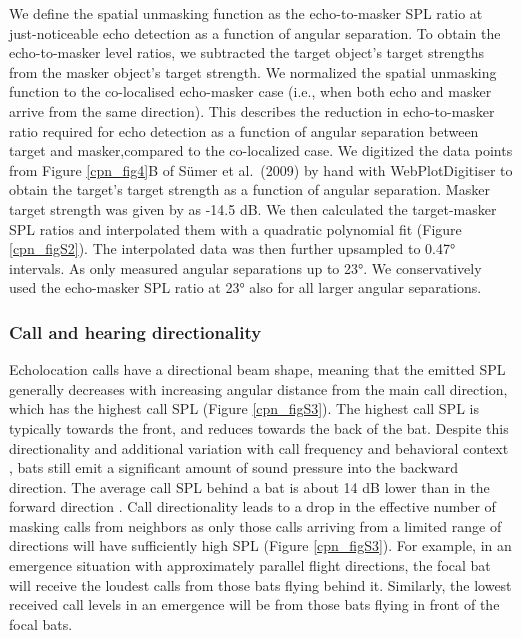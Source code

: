 \documentclass[
]{book}
\begin{document}
We define the spatial unmasking function as the echo-to-masker SPL ratio at just-noticeable echo detection as a function of angular separation. To obtain the echo-to-masker level ratios, we subtracted the target object's target strengths from the masker object's target strength. We normalized the spatial unmasking function to the co-localised echo-masker case (i.e., when both echo and masker arrive from the same direction). This describes the reduction in echo-to-masker ratio required for echo detection as a function of angular separation between target and masker,compared to the co-localized case. We digitized the data points from Figure \ref{cpn_fig4}B of Sümer et al.~(2009) by hand with WebPlotDigitiser \citep{rohatgi2015a} to obtain the target's target strength as a function of angular separation. Masker target strength was given by \citet{suemer2009a} as -14.5 dB. We then calculated the target-masker SPL ratios and interpolated them with a quadratic polynomial fit (Figure \ref{cpn_figS2}). The interpolated data was then further upsampled to 0.47° intervals. As \citet{suemer2009a} only measured angular separations up to 23°. We conservatively used the echo-masker SPL ratio at 23° also for all larger angular separations.

\hypertarget{call-and-hearing-directionality}{%
\subsubsection{\texorpdfstring{Call and hearing directionality \label{cpn_directionality}}{Call and hearing directionality }}\label{call-and-hearing-directionality}}

Echolocation calls have a directional beam shape, meaning that the emitted SPL
generally decreases with increasing angular distance from the main call direction, which has the highest call SPL (Figure \ref{cpn_figS3}). The highest call SPL is typically towards the front, and reduces towards the back of the bat. Despite this directionality and additional variation with call frequency and behavioral context \citep{jakobsen2010a, l2013a, surlykke2012a, giuggioli2015a} , bats still emit a significant amount of sound pressure into the backward direction. The average call SPL behind a bat is about 14 dB lower than in the forward direction \citep[\citet{stidsholt2018a}]{giuggioli2015a}. Call directionality leads to a drop in the effective number of masking calls from neighbors as only those calls arriving from a limited range of directions will have sufficiently high SPL (Figure \ref{cpn_figS3}). For example, in an emergence situation with approximately parallel flight directions, the focal bat will receive the loudest calls from those bats flying behind it. Similarly, the lowest received call levels in an emergence will be from those bats flying in front of the focal bats.
\end{document}
